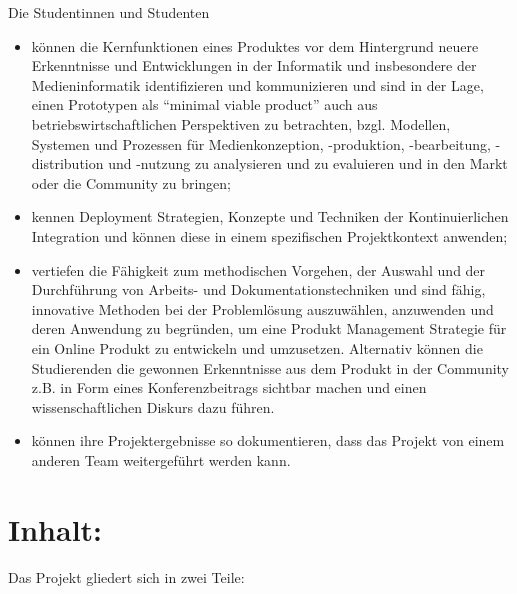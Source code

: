 Die Studentinnen und Studenten

\begin{itemize}
\tightlist
\item
  können die Kernfunktionen eines Produktes vor dem Hintergrund neuere
  Erkenntnisse und Entwicklungen in der Informatik und insbesondere der
  Medieninformatik identifizieren und kommunizieren und sind in der
  Lage, einen Prototypen als ``minimal viable product'' auch aus
  betriebswirtschaftlichen Perspektiven zu betrachten, bzgl. Modellen,
  Systemen und Prozessen für Medienkonzeption, -produktion,
  -bearbeitung, -distribution und -nutzung zu analysieren und zu
  evaluieren und in den Markt oder die Community zu bringen;
\item
  kennen Deployment Strategien, Konzepte und Techniken der
  Kontinuierlichen Integration und können diese in einem spezifischen
  Projektkontext anwenden;
\item
  vertiefen die Fähigkeit zum methodischen Vorgehen, der Auswahl und der
  Durchführung von Arbeits- und Dokumentationstechniken und sind fähig,
  innovative Methoden bei der Problemlösung auszuwählen, anzuwenden und
  deren Anwendung zu begründen, um eine Produkt Management Strategie für
  ein Online Produkt zu entwickeln und umzusetzen. Alternativ können die
  Studierenden die gewonnen Erkenntnisse aus dem Produkt in der
  Community z.B. in Form eines Konferenzbeitrags sichtbar machen und
  einen wissenschaftlichen Diskurs dazu führen.
\item
  können ihre Projektergebnisse so dokumentieren, dass das Projekt von
  einem anderen Team weitergeführt werden kann.
\end{itemize}

\section*{Inhalt:}\label{inhalt-9}

Das Projekt gliedert sich in zwei Teile:

